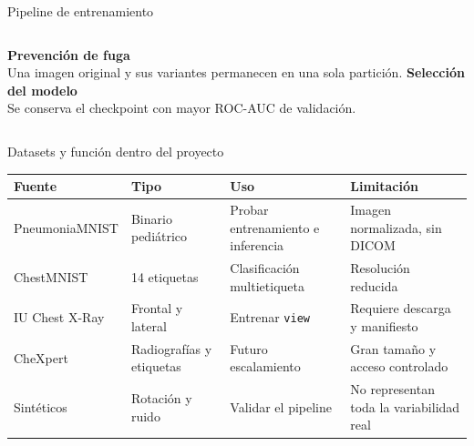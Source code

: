 \documentclass[aspectratio=169,10pt]{beamer}
\begin{document}
\begin{frame}{Pipeline de entrenamiento}
\centering
{}
\vspace{0.75cm}
\begin{columns}[T,onlytextwidth]
{\bfseries\color{Navy}Prevención de fuga}\\
Una imagen original y sus variantes permanecen en una sola partición.
{\bfseries\color{Navy}Selección del modelo}\\
Se conserva el checkpoint con mayor ROC-AUC de validación.
\end{columns}
\end{frame}

\begin{frame}{Datasets y función dentro del proyecto}
\centering
\begin{tabular}{@{}p{2.8cm}p{3.1cm}p{3.2cm}p{3.0cm}@{}}
\toprule
\textbf{Fuente} & \textbf{Tipo} & \textbf{Uso} & \textbf{Limitación} \\
\midrule
PneumoniaMNIST & Binario pediátrico & Probar entrenamiento e inferencia & Imagen normalizada, sin DICOM \\
ChestMNIST & 14 etiquetas & Clasificación multietiqueta & Resolución reducida \\
IU Chest X-Ray & Frontal y lateral & Entrenar \texttt{view} & Requiere descarga y manifiesto \\
CheXpert & Radiografías y etiquetas & Futuro escalamiento & Gran tamaño y acceso controlado \\
Sintéticos & Rotación y ruido & Validar el pipeline & No representan toda la variabilidad real \\
\bottomrule
\end{tabular}
\end{frame}
\end{document}
